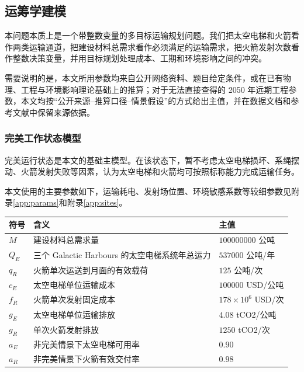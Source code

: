 \documentclass[12pt,a4paper,UTF8]{article}
\begin{document}
\subsection{运筹学建模}

本问题本质上是一个带整数变量的多目标运输规划问题。我们把太空电梯和火箭看作两类运输通道，把建设材料总需求看作必须满足的运输需求，把火箭发射次数看作整数决策变量，并用目标规划处理成本、工期和环境影响之间的冲突。

需要说明的是，本文所用参数均来自公开网络资料、题目给定条件，或在已有物理、工程与环境影响理论基础上的推算；对于无法直接查得的 2050 年远期工程参数，本文均按“公开来源--推算口径--情景假设”的方式给出主值，并在数据文档和参考文献中保留来源依据。

\subsubsection{完美工作状态模型}

完美运行状态是本文的基础主模型。在该状态下，暂不考虑太空电梯损坏、系绳摆动、火箭发射失败等因素，认为太空电梯和火箭均可按照标称能力完成运输任务。

本文使用的主要参数如下，运输耗电、发射场位置、环境敏感系数等较细参数见附录\ref{app:params}和附录\ref{app:sites}。

\begin{center}
\renewcommand{\arraystretch}{1.25}
\begin{tabular}{p{}p{}p{}}
\toprule
符号 & 含义 & 主值 \\
\midrule
\(M\) & 建设材料总需求量 & \(100000000\) 公吨 \\
\(Q_E\) & 三个 Galactic Harbours 的太空电梯系统年总运力 & \(537000\) 公吨/年 \\
\(q_R\) & 火箭单次运送到月面的有效载荷 & \(125\) 公吨/次 \\
\(c_E\) & 太空电梯单位运输成本 & \(100000\) USD/公吨 \\
\(f_R\) & 火箭单次发射固定成本 & \(178\times10^6\) USD/次 \\
\(g_E\) & 太空电梯单位运输排放 & \(4.08\) tCO2/公吨 \\
\(g_R\) & 单次火箭发射排放 & \(1250\) tCO2/次 \\
\(a_E\) & 非完美情景下太空电梯可用率 & \(0.90\) \\
\(a_R\) & 非完美情景下火箭有效交付率 & \(0.98\) \\
\bottomrule
\end{tabular}
\end{center}
\end{document}
